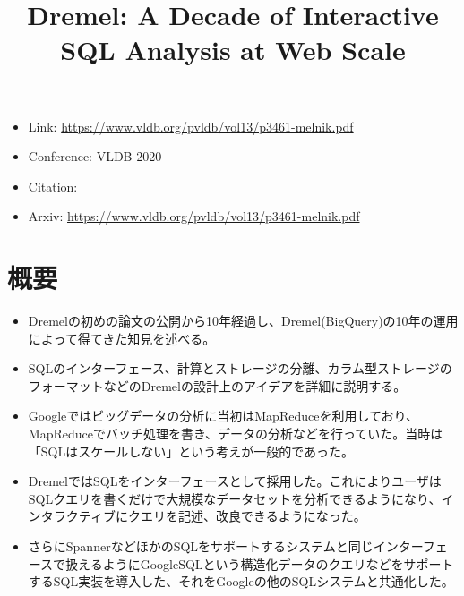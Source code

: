 \documentclass[dvipdfmx,uplatex]{jsarticle}
\title{Dremel: A Decade of Interactive SQL Analysis at Web Scale}
\author{\empty}
\date{\empty}
\theoremstyle{remark}
\newenvironment{simplebox}{
    \begin{tcolorbox}[
        fonttitle=\bfseries,
    ]
}{
    \end{tcolorbox}
}
\newenvironment{method}[1]{
    \begin{tcolorbox}[
        colframe=green!50!black,
        colback=green!50!black!10!white,
        colbacktitle=green!50!black!40!white,
        coltitle=black,
        fonttitle=\bfseries,
        title={#1}
    ]
}{
    \end{tcolorbox}
}
\begin{document}
\maketitle

\begin{itemize}
    \item Link: \url{https://www.vldb.org/pvldb/vol13/p3461-melnik.pdf}
    \item Conference: VLDB 2020
    \item Citation:
    \item Arxiv: \url{https://www.vldb.org/pvldb/vol13/p3461-melnik.pdf}
\end{itemize}

\section{概要}
\begin{simplebox}
\begin{itemize}
    \item Dremelの初めの論文の公開から10年経過し、Dremel(BigQuery)の10年の運用によって得てきた知見を述べる。
    \item SQLのインターフェース、計算とストレージの分離、カラム型ストレージのフォーマットなどのDremelの設計上のアイデアを詳細に説明する。
\end{itemize}
\end{simplebox}

\begin{method}{SQL}
\begin{itemize}
    \item Googleではビッグデータの分析に当初はMapReduceを利用しており、MapReduceでバッチ処理を書き、データの分析などを行っていた。当時は「SQLはスケールしない」という考えが一般的であった。
    \item DremelではSQLをインターフェースとして採用した。これによりユーザはSQLクエリを書くだけで大規模なデータセットを分析できるようになり、インタラクティブにクエリを記述、改良できるようになった。
    \item さらにSpannerなどほかのSQLをサポートするシステムと同じインターフェースで扱えるようにGoogleSQLという構造化データのクエリなどをサポートするSQL実装を導入した、それをGoogleの他のSQLシステムと共通化した。
\end{itemize}
\end{method}
\end{document}

